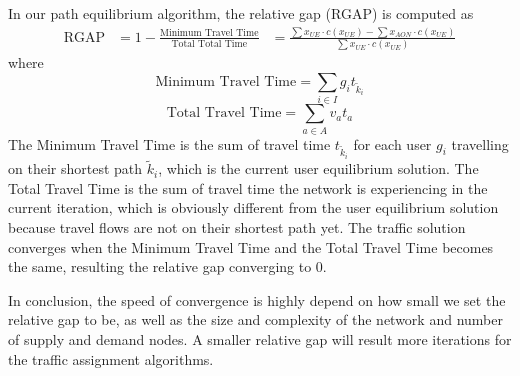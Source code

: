 In our path equilibrium algorithm,
the relative gap (RGAP) is computed as
\begin{align}
    \text{RGAP} &= 1 - \frac{\text{Minimum Travel Time}}{\text{Total Total Time}}
    &= \frac{ \sum x_{UE} \cdot c(x_{UE}) - \sum x_{AON} \cdot c(x_{UE})}{\sum x_{UE} \cdot c(x_{UE}) }
\end{align}
where
\begin{equation}
    \text{Minimum Travel Time} = \sum_{i \in I} g_i t_{\tilde{k}_i}
\end{equation}
\begin{equation}
    \text{Total Travel Time} = \sum_{a \in A} v_a t_a
\end{equation}
The Minimum Travel Time is the sum of travel time $t_{\tilde{k}_i}$ for each user $g_i$ travelling on their shortest path $\tilde{k}_i$,
which is the current user equilibrium solution.
The Total Travel Time is the sum of travel time the network is experiencing in the current iteration,
which is obviously different from the user equilibrium solution because travel flows are not on their shortest path yet.
The traffic solution converges when the Minimum Travel Time and the Total Travel Time becomes the same,
resulting the relative gap converging to 0.

In conclusion,
the speed of convergence is highly depend on how small we set the relative gap to be,
as well as the size and complexity of the network and number of supply and demand nodes.
A smaller relative gap will result more iterations for the traffic assignment algorithms.

